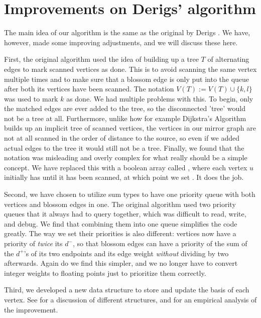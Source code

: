 \section{Improvements on Derigs' algorithm}
The main idea of our algorithm is the same as the original by Derigs \cite{source:derigs_shortest_odd_path}. We have, however, made some improving adjustments, and we will discuss these here.

First, the original algorithm used the idea of building up a tree $T$ of alternating edges to mark scanned vertices as done. This is to avoid scanning the same vertex multiple times and to make sure that a blossom edge is only put into the queue after both its vertices have been scanned. The notation $V(T) := V(T) \cup \{k,l\}$ was used to mark $k$ as done. We had multiple problems with this. To begin, only the matched edges are ever added to the tree, so the disconnected 'tree' would not be a tree at all. Furthermore, unlike how for example Dijkstra's Algorithm builds up an implicit tree of scanned vertices, the vertices in our mirror graph are not at all scanned in the order of distance to the source, so even if we added actual edges to the tree it would still not be a tree. Finally, we found that the notation was misleading and overly complex for what really should be a simple concept. We have replaced this with a boolean array called , where each vertex $u$ initially has  until it has been scanned, at which point we set . It does the job.

Second, we have chosen to utilize sum types to have one priority queue with both vertices and blossom edges in one. The original algorithm used two priority queues that it always had to query together, which was difficult to read, write, and debug. We find that combining them into one queue simplifies the code greatly. The way we set their priorities is also different: vertices now have a priority of \emph{twice} its $d^-$, so that blossom edges can have a priority of the sum of the $d^+$'s of its two endpoints and its edge weight \emph{without} dividing by two afterwards. Again do we find this simpler, and we no longer have to convert integer weights to floating points just to prioritize them correctly.

Third, we developed a new data structure to store and update the basis of each vertex. See  for a discussion of different structures, and  for an empirical analysis of the improvement.
